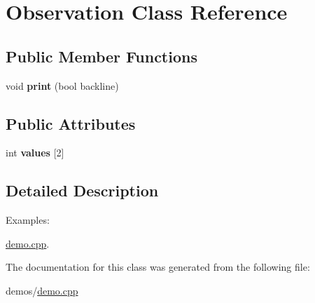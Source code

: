 \hypertarget{classObservation}{}\section{Observation Class Reference}
\label{classObservation}
\subsection*{Public Member Functions}
\begin{DoxyCompactItemize}
\item 
void {\bfseries print} (bool backline)\hypertarget{classObservation_acbc2da8c3b6b8c80feef13ceb203be65}{}\label{classObservation_acbc2da8c3b6b8c80feef13ceb203be65}

\end{DoxyCompactItemize}
\subsection*{Public Attributes}
\begin{DoxyCompactItemize}
\item 
int {\bfseries values} \mbox{[}2\mbox{]}\hypertarget{classObservation_a87baf44e3dbe1c7c43df49a9311d2c05}{}\label{classObservation_a87baf44e3dbe1c7c43df49a9311d2c05}

\end{DoxyCompactItemize}


\subsection{Detailed Description}
\begin{Desc}
\item[Examples\+: ]\par
\hyperlink{demo_8cpp-example}{demo.\+cpp}.\end{Desc}


The documentation for this class was generated from the following file\+:\begin{DoxyCompactItemize}
\item 
demos/\hyperlink{demo_8cpp}{demo.\+cpp}\end{DoxyCompactItemize}
